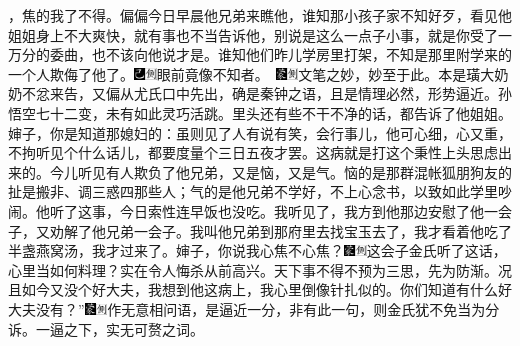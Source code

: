 ，焦的我了不得。偏偏今日早晨他兄弟来瞧他，谁知那小孩子家不知好歹，看见他姐姐身上不大爽快，就有事也不当告诉他，别说是这么一点子小事，就是你受了一万分的委曲，也不该向他说才是。谁知他们昨儿学房里打架，不知是那里附学来的一个人欺侮了他了。{\includegraphics[width=3mm]{../Images/00003}\includegraphics[width=3mm]{../Images/00011}\footnotesize \kaishu 眼前竟像不知者。　\includegraphics[width=3mm]{../Images/00006}\includegraphics[width=3mm]{../Images/00011}\footnotesize \kaishu 文笔之妙，妙至于此。本是璜大奶奶不忿来告，又偏从尤氏口中先出，确是秦钟之语，且是情理必然，形势逼近。孙悟空七十二变，未有如此灵巧活跳。}里头还有些不干不净的话，都告诉了他姐姐。婶子，你是知道那媳妇的：虽则见了人有说有笑，会行事儿，他可心细，心又重，不拘听见个什么话儿，都要度量个三日五夜才罢。这病就是打这个秉性上头思虑出来的。今儿听见有人欺负了他兄弟，又是恼，又是气。恼的是那群混帐狐朋狗友的扯是搬非、调三惑四那些人；气的是他兄弟不学好，不上心念书，以致如此学里吵闹。他听了这事，今日索性连早饭也没吃。我听见了，我方到他那边安慰了他一会子，又劝解了他兄弟一会子。我叫他兄弟到那府里去找宝玉去了，我才看着他吃了半盏燕窝汤，我才过来了。婶子，你说我心焦不心焦？{\includegraphics[width=3mm]{../Images/00006}\includegraphics[width=3mm]{../Images/00011}\footnotesize \kaishu 这会子金氏听了这话，心里当如何料理？实在令人悔杀从前高兴。天下事不得不预为三思，先为防渐。}况且如今又没个好大夫，我想到他这病上，我心里倒像针扎似的。你们知道有什么好大夫没有？”{\includegraphics[width=3mm]{../Images/00006}\includegraphics[width=3mm]{../Images/00011}\footnotesize \kaishu 作无意相问语，是逼近一分，非有此一句，则金氏犹不免当为分诉。一逼之下，实无可赘之词。}

